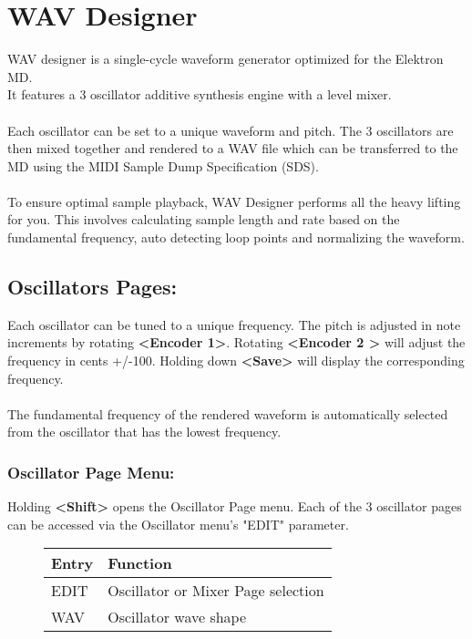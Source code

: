 \chapter{WAV Designer}
WAV designer is a single-cycle waveform generator optimized for the Elektron MD.\\
It features a 3 oscillator additive synthesis engine with a level mixer.\\
\\
Each oscillator can be set to a unique waveform and pitch. The 3 oscillators are then mixed together and rendered to a WAV file which can be transferred to the MD using the MIDI Sample Dump Specification (SDS).\\
\\
To ensure optimal sample playback, WAV Designer performs all the heavy lifting for you. This involves calculating sample length and rate based on the fundamental frequency, auto detecting loop points and normalizing the waveform.
\section{Oscillators Pages:}
Each oscillator can be tuned to a unique frequency. The pitch is adjusted in note increments by rotating \textbf{<Encoder 1>}. Rotating \textbf{<Encoder 2 >} will adjust the frequency in cents +/-100. Holding down \textbf{<Save>} will display the corresponding frequency.\\
\\The fundamental frequency of the rendered waveform is automatically selected from the oscillator that has the lowest frequency.\\

\newpage
\subsection{Oscillator Page Menu:}
Holding \textbf{<Shift>} opens the Oscillator Page menu.
Each of the 3 oscillator pages can be accessed via the Oscillator menu's "EDIT" parameter.
\begin{figure}[hb]
    \begin{tabular}{|l|l|}
    \hline
    \rowcolor[HTML]{C0C0C0}
    Entry     & Function \\ \hline
    EDIT      & Oscillator or Mixer Page selection \\ \hline
    WAV       & Oscillator wave shape\\ \hline
    \end{tabular}
\end{figure}
\newpage


